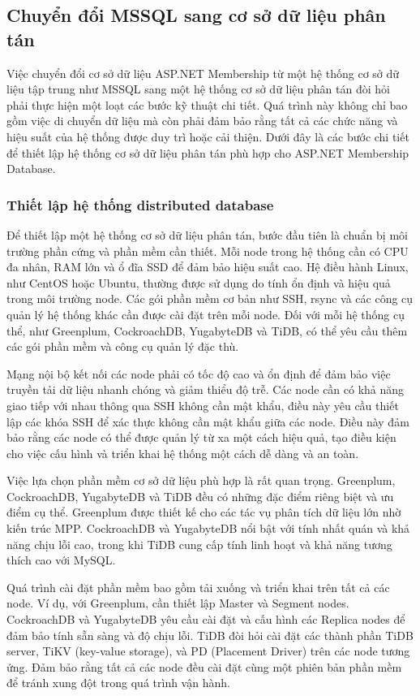 \documentclass{article}[14pt]
\begin{document}
\subsection{Chuyển đổi MSSQL sang cơ sở dữ liệu phân tán}

Việc chuyển đổi cơ sở dữ liệu ASP.NET Membership từ một hệ thống cơ sở dữ liệu tập trung như MSSQL sang một hệ thống cơ sở dữ liệu phân tán đòi hỏi phải thực hiện một loạt các bước kỹ thuật chi tiết. Quá trình này không chỉ bao gồm việc di chuyển dữ liệu mà còn phải đảm bảo rằng tất cả các chức năng và hiệu suất của hệ thống được duy trì hoặc cải thiện. Dưới đây là các bước chi tiết để thiết lập hệ thống cơ sở dữ liệu phân tán phù hợp cho ASP.NET Membership Database.

\subsubsection{Thiết lập hệ thống distributed database}

Để thiết lập một hệ thống cơ sở dữ liệu phân tán, bước đầu tiên là chuẩn bị môi trường phần cứng và phần mềm cần thiết. Mỗi node trong hệ thống cần có CPU đa nhân, RAM lớn và ổ đĩa SSD để đảm bảo hiệu suất cao. Hệ điều hành Linux, như CentOS hoặc Ubuntu, thường được sử dụng do tính ổn định và hiệu quả trong môi trường node. Các gói phần mềm cơ bản như SSH, rsync và các công cụ quản lý hệ thống khác cần được cài đặt trên mỗi node. Đối với mỗi hệ thống cụ thể, như Greenplum, CockroachDB, YugabyteDB và TiDB, có thể yêu cầu thêm các gói phần mềm và công cụ quản lý đặc thù.

Mạng nội bộ kết nối các node phải có tốc độ cao và ổn định để đảm bảo việc truyền tải dữ liệu nhanh chóng và giảm thiểu độ trễ. Các node cần có khả năng giao tiếp với nhau thông qua SSH không cần mật khẩu, điều này yêu cầu thiết lập các khóa SSH để xác thực không cần mật khẩu giữa các node. Điều này đảm bảo rằng các node có thể được quản lý từ xa một cách hiệu quả, tạo điều kiện cho việc cấu hình và triển khai hệ thống một cách dễ dàng và an toàn.

Việc lựa chọn phần mềm cơ sở dữ liệu phù hợp là rất quan trọng. Greenplum, CockroachDB, YugabyteDB và TiDB đều có những đặc điểm riêng biệt và ưu điểm cụ thể. Greenplum được thiết kế cho các tác vụ phân tích dữ liệu lớn nhờ kiến trúc MPP. CockroachDB và YugabyteDB nổi bật với tính nhất quán và khả năng chịu lỗi cao, trong khi TiDB cung cấp tính linh hoạt và khả năng tương thích cao với MySQL.

Quá trình cài đặt phần mềm bao gồm tải xuống và triển khai trên tất cả các node. Ví dụ, với Greenplum, cần thiết lập Master và Segment nodes. CockroachDB và YugabyteDB yêu cầu cài đặt và cấu hình các Replica nodes để đảm bảo tính sẵn sàng và độ chịu lỗi. TiDB đòi hỏi cài đặt các thành phần TiDB server, TiKV (key-value storage), và PD (Placement Driver) trên các node tương ứng. Đảm bảo rằng tất cả các node đều cài đặt cùng một phiên bản phần mềm để tránh xung đột trong quá trình vận hành.
\end{document}
